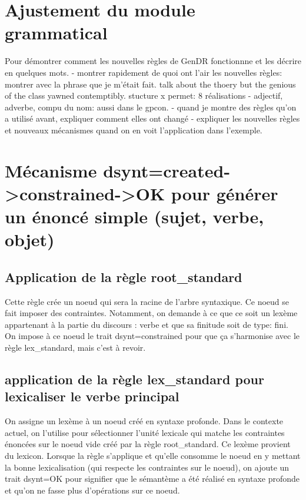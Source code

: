 \section{Ajustement du module grammatical}
Pour démontrer comment les nouvelles règles de GenDR fonctionnne et les décrire en quelques mots.
- montrer rapidement de quoi ont l'air les nouvelles règles: montrer avec la phrase que je m'était fait. talk about the thoery but the genious of the class yawned contemptibly.
stucture x permet: 8 réalisations
- adjectif, adverbe, compu du nom: aussi dans le gpcon.
- quand je montre des règles qu'on a utilisé avant, expliquer comment elles ont changé
- expliquer les nouvelles règles et nouveaux mécanismes quand on en voit l'application dans l'exemple.

\section{Mécanisme dsynt=created->constrained->OK pour générer un énoncé simple (sujet, verbe, objet)}

\subsection{Application de la règle root{\_}standard}
Cette règle crée un noeud qui sera la racine de l'arbre syntaxique. Ce noeud se fait imposer des contraintes. Notamment, on demande à ce que ce soit un lexème appartenant à la partie du discours : verbe et que sa finitude soit de type: fini. On impose à ce noeud le trait dsynt=constrained pour que ça s'harmonise avec le règle lex{\_}standard, mais c'est à revoir.

\subsection{application de la règle lex{\_}standard pour lexicaliser le verbe principal}
On assigne un lexème à un noeud  créé en syntaxe profonde. Dans le contexte actuel, on l'utilise pour sélectionner l'unité lexicale qui matche les contraintes énoncées sur le noeud vide créé par la règle root{\_}standard. Ce lexème provient du lexicon. Lorsque la règle s'applique et qu'elle consomme le noeud en y mettant la bonne lexicalisation (qui respecte les contraintes sur le noeud), on ajoute un trait dsynt=OK pour signifier que le sémantème a été réalisé en syntaxe profonde et qu'on ne fasse plus d'opérations sur ce noeud.

